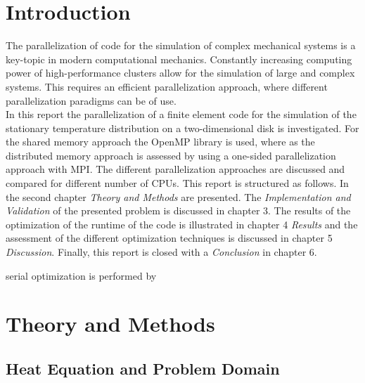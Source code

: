 \documentclass[a4paper, 11pt, oneside]{scrartcl}
\begin{document}



\mabstract{\blindtext}

\section{Introduction}

The parallelization of code for the simulation of complex mechanical systems is a key-topic in modern computational mechanics. Constantly increasing computing power of high-performance clusters allow for the simulation of large and complex systems. This requires an efficient parallelization approach, where different parallelization paradigms can be of use. \\

In this report the parallelization of a finite element code for the simulation of the stationary temperature distribution on a two-dimensional disk is investigated. For the shared memory approach the OpenMP library is used, where as the distributed memory approach is assessed by using a one-sided parallelization approach with MPI. The different parallelization approaches are discussed and compared for different number of CPUs. This report is structured as follows. In the second chapter \textit{Theory and Methods} are presented. The \textit{Implementation and Validation} of the presented problem is discussed in chapter 3. The results of the optimization of the runtime of the code is illustrated in chapter 4 \textit{Results} and the assessment of the different optimization techniques is discussed in chapter 5 \textit{Discussion}. Finally, this report is closed with a \textit{Conclusion} in chapter 6.

serial optimization is performed by  

\section{Theory and Methods}

\subsection{Heat Equation and Problem Domain}
\end{document}

